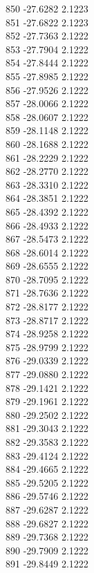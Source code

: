 \documentclass[11pt]{article}
\theoremstyle{definition}
\theoremstyle{plain}
\begin{document}
{850 -27.6282 2.1223\\
851 -27.6822 2.1223\\
852 -27.7363 2.1222\\
853 -27.7904 2.1222\\
854 -27.8444 2.1222\\
855 -27.8985 2.1222\\
856 -27.9526 2.1222\\
857 -28.0066 2.1222\\
858 -28.0607 2.1222\\
859 -28.1148 2.1222\\
860 -28.1688 2.1222\\
861 -28.2229 2.1222\\
862 -28.2770 2.1222\\
863 -28.3310 2.1222\\
864 -28.3851 2.1222\\
865 -28.4392 2.1222\\
866 -28.4933 2.1222\\
867 -28.5473 2.1222\\
868 -28.6014 2.1222\\
869 -28.6555 2.1222\\
870 -28.7095 2.1222\\
871 -28.7636 2.1222\\
872 -28.8177 2.1222\\
873 -28.8717 2.1222\\
874 -28.9258 2.1222\\
875 -28.9799 2.1222\\
876 -29.0339 2.1222\\
877 -29.0880 2.1222\\
878 -29.1421 2.1222\\
879 -29.1961 2.1222\\
880 -29.2502 2.1222\\
881 -29.3043 2.1222\\
882 -29.3583 2.1222\\
883 -29.4124 2.1222\\
884 -29.4665 2.1222\\
885 -29.5205 2.1222\\
886 -29.5746 2.1222\\
887 -29.6287 2.1222\\
888 -29.6827 2.1222\\
889 -29.7368 2.1222\\
890 -29.7909 2.1222\\
891 -29.8449 2.1222\\
}
\end{document}
